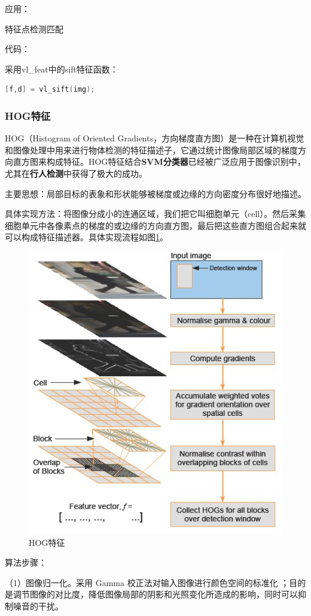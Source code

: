 \documentclass[12pt]{article}
\begin{document}
{\color{blue}应用}：

特征点检测匹配

{\color{blue}代码}：

采用vl\_feat中的sift特征函数：
    \begin{lstlisting}[language=C++]
    [f,d] = vl_sift(img);
    \end{lstlisting}

\subsubsection{HOG特征}

HOG\cite{dalal2005histograms}（Histogram of Oriented Gradients，方向梯度直方图）是一种在计算机视觉和图像处理中用来进行物体检测的特征描述子，它通过统计图像局部区域的梯度方向直方图来构成特征。HOG特征结合\textbf{SVM分类器}已经被广泛应用于图像识别中，尤其在\textbf{行人检测}中获得了极大的成功。

{\color{blue}主要思想}：局部目标的表象和形状能够被梯度或边缘的方向密度分布很好地描述。

{\color{blue}具体实现方法}：将图像分成小的连通区域，我们把它叫细胞单元（cell）。然后采集细胞单元中各像素点的梯度的或边缘的方向直方图，最后把这些直方图组合起来就可以构成特征描述器。具体实现流程如图\ref{fig:shixian}。
        \begin{figure}
            \centering
            \includegraphics[width=0.4\linewidth]{flowchart}
            \caption{HOG特征}
            \label{fig:shixian}
        \end{figure}

{\color{blue}算法步骤}：

（1）图像归一化。采用 Gamma 校正法对输入图像进行颜色空间的标准化 ；目的是调节图像的对比度，降低图像局部的阴影和光照变化所造成的影响，同时可以抑制噪音的干扰。
\end{document}
